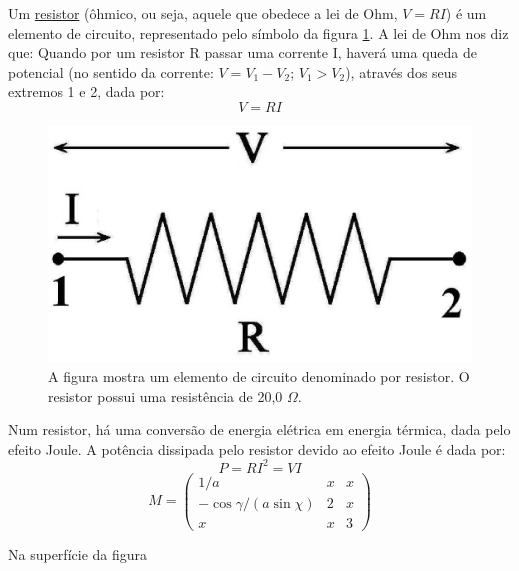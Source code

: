 \documentclass[10pt,a4paper,twocolumn,showkeys,showpacs,aps,groupedaddress,noeprint]{revtex4-1}
\begin{document}
Um \href{https://www.google.com.br}{resistor} (ôhmico, ou seja, aquele que obedece a lei de Ohm, $V=RI$)
é um elemento de circuito, representado pelo símbolo da figura 
\ref{fig:Resistor}. A lei de Ohm nos diz que: Quando por um resistor R passar
uma corrente I, haverá uma queda de potencial (no sentido da corrente:
$V=V_{1}-V_{2}$; $V_{1}>V_{2}$), através dos seus extremos 1 e 2, dada
por:
\begin{equation*}
V=RI
\end{equation*}

\begin{figure}[!h]
\begin{center}
\includegraphics[width=0.70\linewidth]{Resistor_02.eps}
\end{center}
\caption[]{A figura mostra um elemento de circuito denominado por resistor. O 
resistor possui uma resistência de 20,0 $\Omega$.}
\label{fig:Resistor}
\end{figure}


Num resistor, há uma conversão de energia elétrica em energia
térmica, dada pelo efeito Joule. A potência dissipada pelo resistor
devido ao efeito Joule é dada por\cite{RLandau97,DeVries93}:
\begin{equation*}
P=RI^{2}=VI
\end{equation*}
\lipsum[3]
\begin{equation}
M =
\begin{pmatrix}
1/a & x & x \\
-\cos\gamma/(a\sin\chi) & 2 & x \\
x & x & 3
\end{pmatrix}
\end{equation}

Na superfície da figura
\end{document}
